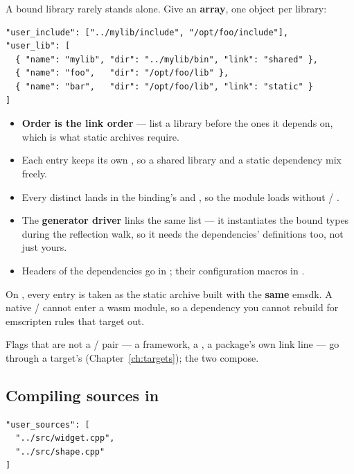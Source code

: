 A bound library rarely stands alone. Give  an \textbf{array},
one object per library:

\begin{lstlisting}[style=json]
"user_include": ["../mylib/include", "/opt/foo/include"],
"user_lib": [
  { "name": "mylib", "dir": "../mylib/bin", "link": "shared" },
  { "name": "foo",   "dir": "/opt/foo/lib" },
  { "name": "bar",   "dir": "/opt/foo/lib", "link": "static" }
]
\end{lstlisting}

\begin{itemize}
  \item \textbf{Order is the link order} --- list a library before the ones it
    depends on, which is what static archives require.
  \item Each entry keeps its own , so a shared library and a static
    dependency mix freely.
  \item Every distinct  lands in the binding's  and
    , so the module loads without
     / .
  \item The \textbf{generator driver} links the same list --- it instantiates
    the bound types during the reflection walk, so it needs the dependencies'
    definitions too, not just yours.
  \item Headers of the dependencies go in ; their
    configuration macros in .
\end{itemize}

\begin{warn}
On , every entry is taken as the static archive 
built with the \textbf{same} emsdk. A native  /  cannot
enter a wasm module, so a dependency you cannot rebuild for emscripten rules
that target out.
\end{warn}

Flags that are not a / pair --- a framework, a
, a package's own link line --- go through a target's
 (Chapter~\ref{ch:targets}); the two compose.

\subsection{Compiling sources in}

\begin{lstlisting}[style=json]
"user_sources": [
  "../src/widget.cpp",
  "../src/shape.cpp"
]
\end{lstlisting}

